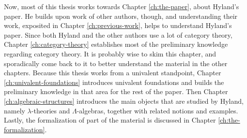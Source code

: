 Now, most of this thesis works towards Chapter \ref{ch:the-paper}, about Hyland's paper.
He builds upon work of other authors, though, and understanding their work, exposited in Chapter \ref{ch:previous-work}, helps to understand Hyland's paper.
Since both Hyland and the other authors use a lot of category theory, Chapter \ref{ch:category-theory} establishes most of the preliminary knowledge regarding category theory. It is probably wise to skim this chapter, and sporadically come back to it to better understand the material in the other chapters.
Because this thesis works from a univalent standpoint, Chapter \ref{ch:univalent-foundations} introduces univalent foundations and builds the preliminary knowledge in that area for the rest of the paper.
Then Chapter \ref{ch:algebraic-structures} introduces the main objects that are studied by Hyland, namely $ \lambda $-theories and $ \Lambda $-algebras, together with related notions and examples.
Lastly, the formalization of part of the material is discussed in Chapter \ref{ch:the-formalization}.
